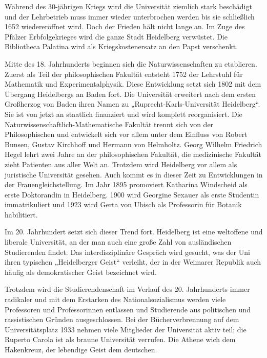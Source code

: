 Während des 30-jährigen Kriegs wird die Universität ziemlich stark beschädigt und der Lehrbetrieb muss immer wieder unterbrochen werden bis sie schließlich 1652 wiedereröffnet wird. Doch der Frieden hält nicht lange an. Im Zuge des Pfälzer Erbfolgekrieges wird die ganze Stadt Heidelberg verwüstet. Die Bibliotheca Palatina wird als Kriegskostenersatz an den Papst verschenkt. 


Mitte des 18. Jahrhunderts beginnen sich die Naturwissenschaften zu etablieren. Zuerst als Teil der philosophischen Fakultät entsteht 1752 der Lehrstuhl für Mathematik und Experimentalphysik. Diese Entwicklung setzt sich 1802 mit dem Übergang Heidelbergs an Baden fort. Die Universität erweitert nach dem ersten Großherzog von Baden ihren Namen zu „Ruprecht-Karls-Universität Heidelberg“. Sie ist von jetzt an staatlich finanziert und wird komplett reorganisiert. Die Naturwissenschaftlich-Mathematische Fakultät trennt sich von der Philosophischen und entwickelt sich vor allem unter dem Einfluss von Robert Bunsen, Gustav Kirchhoff und Hermann von Helmholtz. Georg Wilhelm Friedrich Hegel lehrt zwei Jahre an der philosophischen Fakultät, die medizinische Fakultät zieht Patienten aus aller Welt an. Trotzdem wird Heidelberg vor allem als juristische Universität gesehen. Auch kommt es in dieser Zeit zu Entwicklungen in der Frauengleichstellung. Im Jahr 1895 promoviert Katharina Windscheid als erste Doktorandin in Heidelberg. 1900 wird Georgine Sexauer als erste Studentin immatrikuliert und 1923 wird Gerta von Ubisch als Professorin für Botanik habilitiert.

Im 20. Jahrhundert setzt sich dieser Trend fort. Heidelberg ist eine weltoffene und liberale Universität, an der man auch eine große Zahl von ausländischen Studierenden findet. Das interdisziplinäre Gespräch wird gesucht, was der Uni ihren typischen „Heidelberger Geist“ verleiht, der in der Weimarer Republik auch häufig als demokratischer Geist bezeichnet wird.

Trotzdem wird die Studierendenschaft im Verlauf des 20. Jahrhunderts immer radikaler und mit dem Erstarken des Nationalsozialismus werden viele Professoren und Professorinnen entlassen und Studierende aus politischen und rassistischen Gründen ausgeschlossen. Bei der Bücherverbrennung auf dem Universitätsplatz 1933 nehmen viele Mitglieder der Universität aktiv teil; die Ruperto Carola ist als braune Universität verrufen. Die Athene wich dem Hakenkreuz, der lebendige Geist dem deutschen. %

